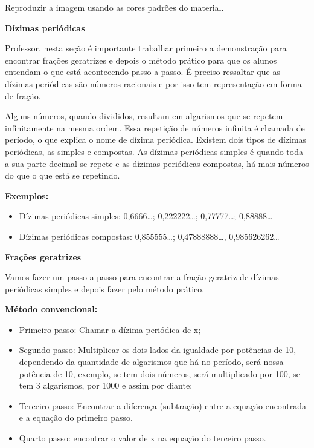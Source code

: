 Reproduzir a imagem usando as cores padrões do material.

\textbf{Dízimas periódicas}

Professor, nesta seção é importante trabalhar primeiro a demonstração
para encontrar frações geratrizes e depois o método prático para que os
alunos entendam o que está acontecendo passo a passo. É preciso
ressaltar que as dízimas periódicas são números racionais e por isso tem
representação em forma de fração.

Alguns números, quando divididos, resultam em algarismos que se repetem
infinitamente na mesma ordem. Essa repetição de números infinita é
chamada de período, o que explica o nome de dízima periódica. Existem
dois tipos de dízimas periódicas, as simples e compostas. As dízimas
periódicas simples é quando toda a sua parte decimal se repete e as
dízimas periódicas compostas, há mais números do que o que está se
repetindo.

\textbf{Exemplos:}

\begin{itemize}
\item
  Dízimas periódicas simples: 0,6666\ldots; 0,222222\ldots;
  0,77777\ldots; 0,88888\ldots{}
\item
  Dízimas periódicas compostas: 0,855555\ldots; 0,47888888\ldots,
  0,985626262\ldots{}
\end{itemize}

\textbf{Frações geratrizes}

Vamos fazer um passo a passo para encontrar a fração geratriz de dízimas
periódicas simples e depois fazer pelo método prático.

\textbf{Método convencional:}

\begin{itemize}
\item
  Primeiro passo: Chamar a dízima periódica de x;
\item
  Segundo passo: Multiplicar os dois lados da igualdade por potências de
  10, dependendo da quantidade de algarismos que há no período, será
  nossa potência de 10, exemplo, se tem dois números, será multiplicado
  por 100, se tem 3 algarismos, por 1000 e assim por diante;
\item
  Terceiro passo: Encontrar a diferença (subtração) entre a equação
  encontrada e a equação do primeiro passo.
\item
  Quarto passo: encontrar o valor de x na equação do terceiro passo.
\end{itemize}

